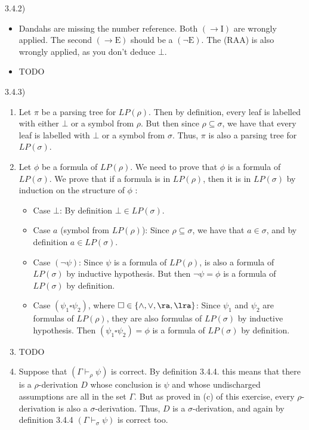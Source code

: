 3.4.2)
\begin{itemize}
  \item Dandahs are missing the number reference. Both \((\to \text{I})\) are
  wrongly applied. The second \((\to \text{E})\) should be a \((\neg
  \text{E})\). The (RAA) is also wrongly applied, as you don't deduce \(\bot\).
  \item TODO
\end{itemize}
3.4.3)
\begin{enumerate}
  \item Let \(\pi\) be a parsing tree for \(LP(\rho)\). Then by definition,
  every leaf is labelled with either \(\bot\) or a symbol from \(\rho\). But
  then since \(\rho \subseteq \sigma\), we have that every leaf is labelled
  with \(\bot\) or a symbol from \(\sigma\).
  Thus, \(\pi\) is also a parsing tree for \(LP(\sigma)\).
  \item Let \(\phi\) be a formula of \(LP(\rho)\). We need to prove that
  \(\phi\) is a formula of \(LP(\sigma)\). We prove that if a formula is in
  \(LP(\rho)\), then it is in \(LP(\sigma)\) by induction on the structure of
  \(\phi\) :
  \begin{itemize}
    \item Case \(\bot\): By definition \(\bot \in LP(\sigma)\).
    \item Case \(a\) (symbol from \(LP(\rho)\)): Since \(\rho \subseteq
    \sigma\), we have that \(a \in \sigma\), and by definition \(a \in
    LP(\sigma)\).
    \item Case \((\neg \psi)\): Since \(\psi\) is a formula of \(LP(\rho)\),
    is also a formula of \(LP(\sigma)\) by inductive hypothesis. But then
    \(\neg \psi = \phi\) is a formula of \(LP(\sigma)\) by definition.
    \item Case \((\psi_1 \square \psi_2)\), where \(\square \in \{\land, \lor, \ra, \lra\}\): Since \(\psi_1\) and \(\psi_2\) are formulas of \(LP(\rho)\),
    they are also formulas of \(LP(\sigma)\) by inductive hypothesis. Then
    \((\psi_1 \square \psi_2) = \phi\) is a formula of \(LP(\sigma)\) by
    definition.
  \end{itemize}
  \item TODO
  \item Suppose that \((\Gamma \vdash_{\rho} \psi)\) is correct. By
  definition 3.4.4. this means that there is a \(\rho\)-derivation \(D\)
  whose conclusion is \(\psi\) and whose undischarged assumptions are all in
  the set \(\Gamma\). But as proved in (c) of this exercise, every
  \(\rho\)-derivation is also a \(\sigma\)-derivation. Thus, \(D\) is a
  \(\sigma\)-derivation, and again by definition 3.4.4 \((\Gamma
  \vdash_{\sigma} \psi)\) is correct too.
\end{enumerate}


